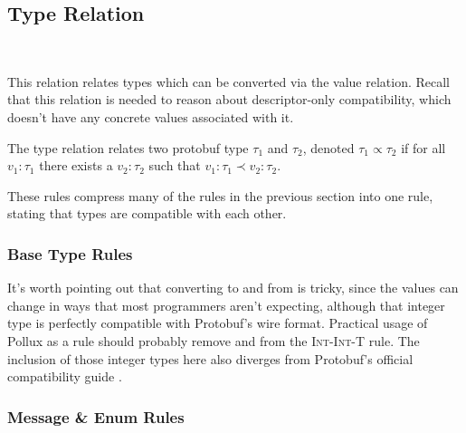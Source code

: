\subsection{Type Relation}~\label{sec:typ-rel}

This relation relates types which can be converted via the value
relation. Recall that this relation is needed to reason about descriptor-only
compatibility, which doesn't have any concrete values associated with it.

\begin{definition}
  The type relation relates two protobuf type $\tau_1$ and $\tau_2$, denoted $\tau_1 \propto
  \tau_2$ if for all $v_1:\tau_1$ there exists a $v_2:\tau_2$ such that $v_1:\tau_1 \prec v_2:\tau_2$.
\end{definition}

These rules compress many of the rules in the previous section into one rule,
stating that types are compatible with each other.

\subsubsection{Base Type Rules}

\begin{mathpar}


\end{mathpar}

It's worth pointing out that converting to and from  is tricky, since
the values can change in ways that most programmers aren't expecting, although
that integer type is perfectly compatible with Protobuf's wire format. Practical
usage of Pollux as a rule should probably remove \sints{} and \sintl{} from the
\textsc{Int-Int-T} rule. The inclusion of those integer types here also diverges
from Protobuf's official compatibility guide \cite{LanguageGuideProto}.

\subsubsection{Message \& Enum Rules}

